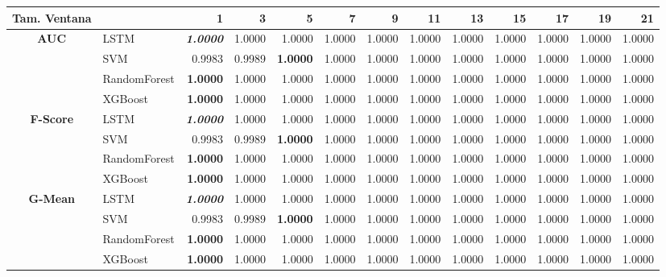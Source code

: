 \begin{table}[H]
	\centering
	\begin{adjustbox}{max width=12cm}
		\begin{tabular}{|c|l|r|r|r|r|r|r|r|r|r|r|r|}
			\hline
			\textbf{Tam. Ventana}&         &      1  &      3  &   5  &   7  &   9  &   11 &   13 &   15 &   17 &   19 &   21 \\
			\hline
			\textbf{AUC} &  LSTM & \textit{ \textbf{  1.0000 } } &  1.0000 &  1.0000 &  1.0000 &  1.0000 &  1.0000 &  1.0000 &  1.0000 &  1.0000 &  1.0000 &  1.0000 \\
			&  SVM &  0.9983 &  0.9989 & \textbf{  1.0000 } &  1.0000 &  1.0000 &  1.0000 &  1.0000 &  1.0000 &  1.0000 &  1.0000 &  1.0000 \\
			&  RandomForest & \textbf{  1.0000 } &  1.0000 &  1.0000 &  1.0000 &  1.0000 &  1.0000 &  1.0000 &  1.0000 &  1.0000 &  1.0000 &  1.0000 \\
			&  XGBoost & \textbf{  1.0000 } &  1.0000 &  1.0000 &  1.0000 &  1.0000 &  1.0000 &  1.0000 &  1.0000 &  1.0000 &  1.0000 &  1.0000 \\
			\hline
			\textbf{F-Score} &  LSTM & \textit{ \textbf{  1.0000 } } &  1.0000 &  1.0000 &  1.0000 &  1.0000 &  1.0000 &  1.0000 &  1.0000 &  1.0000 &  1.0000 &  1.0000 \\
			&  SVM &  0.9983 &  0.9989 & \textbf{  1.0000 } &  1.0000 &  1.0000 &  1.0000 &  1.0000 &  1.0000 &  1.0000 &  1.0000 &  1.0000 \\
			&  RandomForest & \textbf{  1.0000 } &  1.0000 &  1.0000 &  1.0000 &  1.0000 &  1.0000 &  1.0000 &  1.0000 &  1.0000 &  1.0000 &  1.0000 \\
			&  XGBoost & \textbf{  1.0000 } &  1.0000 &  1.0000 &  1.0000 &  1.0000 &  1.0000 &  1.0000 &  1.0000 &  1.0000 &  1.0000 &  1.0000 \\
			\hline
			\textbf{G-Mean} &  LSTM & \textit{ \textbf{  1.0000 } } &  1.0000 &  1.0000 &  1.0000 &  1.0000 &  1.0000 &  1.0000 &  1.0000 &  1.0000 &  1.0000 &  1.0000 \\
			&  SVM &  0.9983 &  0.9989 & \textbf{  1.0000 } &  1.0000 &  1.0000 &  1.0000 &  1.0000 &  1.0000 &  1.0000 &  1.0000 &  1.0000 \\
			&  RandomForest & \textbf{  1.0000 } &  1.0000 &  1.0000 &  1.0000 &  1.0000 &  1.0000 &  1.0000 &  1.0000 &  1.0000 &  1.0000 &  1.0000 \\
			&  XGBoost & \textbf{  1.0000 } &  1.0000 &  1.0000 &  1.0000 &  1.0000 &  1.0000 &  1.0000 &  1.0000 &  1.0000 &  1.0000 &  1.0000 \\

\end{tabular}
\end{adjustbox}
\end{table}
